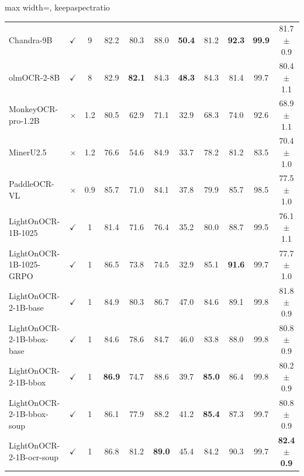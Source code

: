 \documentclass{article}
\newcommand{\bestA}[1]{\cellcolor{blue!12}\textbf{#1}}  %
\newcommand{\bestB}[1]{\cellcolor{green!12}\textbf{#1}} %
\begin{document}
\begin{table}[t]
\begin{adjustbox}{max width=\linewidth, keepaspectratio}
\begin{tabular}{lcccccccccc}
Chandra-9B & $\checkmark$ & 9 & 82.2 & 80.3 & 88.0 & \bestA{50.4} & 81.2 & \bestA{92.3} & \bestA{99.9} & 81.7 $\pm$ 0.9 \\
olmOCR-2-8B & $\checkmark$ & 8 & 82.9 & \textbf{82.1} & 84.3 & \textbf{48.3} & 84.3 & 81.4 & 99.7 & 80.4 $\pm$ 1.1 \\
MonkeyOCR-pro-1.2B & $\times$ & 1.2 & 80.5 & 62.9 & 71.1 & 32.9 & 68.3 & 74.0 & 92.6 & 68.9 $\pm$ 1.1 \\
MinerU2.5 & $\times$ & 1.2 & 76.6 & 54.6 & 84.9 & 33.7 & 78.2 & 81.2 & 83.5 & 70.4 $\pm$ 1.0 \\
PaddleOCR-VL & $\times$ & 0.9 & 85.7 & 71.0 & 84.1 & 37.8 & 79.9 & 85.7 & 98.5 & 77.5 $\pm$ 1.0 \\

\midrule
LightOnOCR-1B-1025 & $\checkmark$ & 1 & 81.4 & 71.6 & 76.4 & 35.2 & 80.0 & 88.7 & 99.5 & 76.1 $\pm$ 1.1 \\
LightOnOCR-1B-1025-GRPO & $\checkmark$ & 1 & 86.5 & 73.8 & 74.5 & 32.9 & 85.1 & \textbf{91.6} & 99.7 & 77.7 $\pm$ 1.0 \\
\midrule

LightOnOCR-2-1B-base & $\checkmark$ & 1 & 84.9 & 80.3 & 86.7 & 47.0 & 84.6 & 89.1 & 99.8 & 81.8 $\pm$ 0.9  \\

LightOnOCR-2-1B-bbox-base & $\checkmark$ & 1 & 84.6 & 78.6 & 84.7 & 46.0 &  83.8 & 88.0 & 99.8 & 80.8 $\pm$ 0.9 \\

LightOnOCR-2-1B-bbox & $\checkmark$ & 1 & \textbf{86.9} & 74.7 & 88.6 & 39.7 & \textbf{85.0} & 86.4 & 99.8 & 80.2 $\pm$ 0.9\\

LightOnOCR-2-1B-bbox-soup & $\checkmark$ & 1 & 86.1 & 77.9 & 88.2 & 41.2 & \bestA{85.4} & 87.3 & 99.7 & 80.8 $\pm$ 0.9\\

LightOnOCR-2-1B-ocr-soup & $\checkmark$ & 1 & 86.8 & 81.2 & \bestA{89.0} & 45.4 &  84.2 & 90.3 & 99.7 & \textbf{82.4 $\pm$ 0.9} \\


\end{tabular}
\end{adjustbox}
\end{table}
\end{document}
